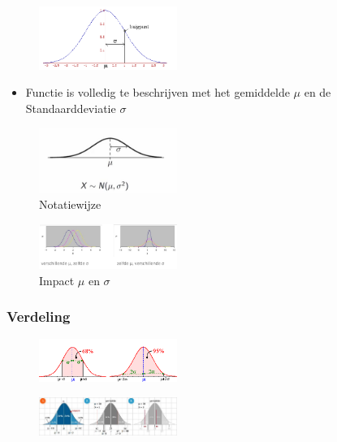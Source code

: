 \documentclass{article}
\begin{document}
\begin{figure}[H]
    \centering
    \includegraphics[width=0.4\textwidth]{gauss-buigpunt.png}
    \caption{}
\end{figure}

\begin{itemize}
    \item Functie is volledig te beschrijven met het gemiddelde $\mu$ en de Standaarddeviatie $\sigma$
\end{itemize}

\begin{figure}[H]
    \centering
    \includegraphics[width=0.4\textwidth]{gauss-notatiewijze.png}
    \caption{Notatiewijze}
\end{figure}

\begin{figure}[H]
    \centering
    \includegraphics[width=0.4\textwidth]{gauss-verschillend.png}
    \caption{Impact $\mu$ en $\sigma$}
\end{figure}

\subsubsection{Verdeling}

\begin{figure}[H]
    \centering
    \includegraphics[width=0.4\textwidth]{gauss-verdeling.png}
    \caption{}
\end{figure}

\begin{figure}[H]
    \centering
    \includegraphics[width=0.4\textwidth]{gauss-verdeling2.png}
    \caption{}
\end{figure}
\end{document}
